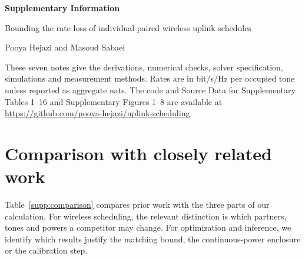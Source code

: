 \documentclass[10pt,letterpaper]{article}
\begin{document}
\begin{center}
{\Large\bfseries Supplementary Information\par}
\medskip
{\large Bounding the rate loss of individual paired wireless uplink schedules\par}
\medskip
Pooya Hejazi and Masoud Sabaei
\end{center}
\noindent These seven notes give the derivations, numerical checks, solver specification, simulations and measurement methods. Rates are in bit/s/Hz per occupied tone unless reported as aggregate nats. The code and Source Data for Supplementary Tables 1--16 and Supplementary Figures 1--8 are available at \url{https://github.com/pooya-hejazi/uplink-scheduling}.
\section{Comparison with closely related work}
\label{suppnote:literature}
Table~\ref{supp:comparison} compares prior work with the three parts of our calculation. For wireless scheduling, the relevant distinction is which partners, tones and powers a competitor may change. For optimization and inference, we identify which results justify the matching bound, the continuous-power enclosure or the calibration step.
\end{document}
